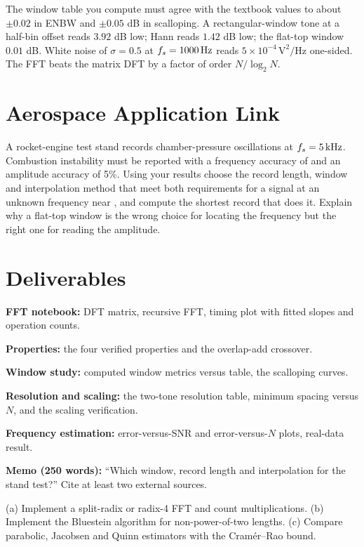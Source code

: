 \documentclass[11pt,a4paper]{article}
\begin{document}
\begin{checkpoint}
The window table you compute must agree with the textbook values to about $\pm0.02$ in ENBW and $\pm0.05$ dB in scalloping. A rectangular-window tone at a half-bin offset reads $3.92$ dB low; Hann reads $1.42$ dB low; the flat-top window $0.01$ dB. White noise of $\sigma=0.5$ at $f_s=\SI{1000}{\hertz}$ reads $5\times10^{-4}\,\mathrm{V^2/Hz}$ one-sided. The FFT beats the matrix DFT by a factor of order $N/\log_2N$.
\end{checkpoint}

\section*{Aerospace Application Link}
A rocket-engine test stand records chamber-pressure oscillations at $f_s=\SI{5}{\kilo\hertz}$. Combustion instability must be reported with a frequency accuracy of  and an amplitude accuracy of 5\%. Using your results choose the record length, window and interpolation method that meet both requirements for a signal at an unknown frequency near , and compute the shortest record that does it. Explain why a flat-top window is the wrong choice for locating the frequency but the right one for reading the amplitude.

\section*{Deliverables}
\begin{delivs}
  \item[D1] \textbf{FFT notebook:} DFT matrix, recursive FFT, timing plot with fitted slopes and operation counts.
  \item[D2] \textbf{Properties:} the four verified properties and the overlap-add crossover.
  \item[D3] \textbf{Window study:} computed window metrics versus table, the scalloping curves.
  \item[D4] \textbf{Resolution and scaling:} the two-tone resolution table, minimum spacing versus $N$, and the scaling verification.
  \item[D5] \textbf{Frequency estimation:} error-versus-SNR and error-versus-$N$ plots, real-data result.
  \item[D6] \textbf{Memo (250 words):} ``Which window, record length and interpolation for the stand test?'' Cite at least two external sources.
  \item[Bonus] (a) Implement a split-radix or radix-4 FFT and count multiplications. (b) Implement the Bluestein algorithm for non-power-of-two lengths. (c) Compare parabolic, Jacobsen and Quinn estimators with the Cram\'er--Rao bound.
\end{delivs}
\end{document}
